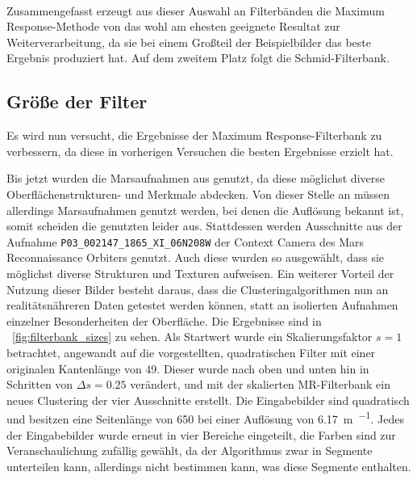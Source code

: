 \paragraph{}
Zusammengefasst erzeugt aus dieser Auswahl an Filterbänden die Maximum Response-Methode von \cite{visgeo} das wohl am ehesten geeignete Resultat zur Weiterverarbeitung, da sie bei einem Großteil der Beispielbilder das beste Ergebnis produziert hat. Auf dem zweitem Platz folgt die Schmid-Filterbank.

\subsection{Größe der Filter}
\label{ssec:exp_filtersize}


Es wird nun versucht, die Ergebnisse der Maximum Response-Filterbank zu verbessern, da diese in vorherigen Versuchen die besten Ergebnisse erzielt hat.

Bis jetzt wurden die Marsaufnahmen aus \cite[Kap.~7]{greeley_13} genutzt, da diese möglichst diverse Oberflächenstrukturen- und Merkmale abdecken. Von dieser Stelle an müssen allerdings Marsaufnahmen genutzt werden, bei denen die Auflösung bekannt ist, somit scheiden die genutzten leider aus. Stattdessen werden Ausschnitte aus der Aufnahme \texttt{P03\_002147\_1865\_XI\_06N208W} der Context Camera des Mars Reconnaissance Orbiters genutzt. Auch diese wurden so ausgewählt, dass sie möglichst diverse Strukturen und Texturen aufweisen. Ein weiterer Vorteil der Nutzung dieser Bilder besteht daraus, dass die Clusteringalgorithmen nun an realitätsnähreren Daten getestet werden können, statt an isolierten Aufnahmen einzelner Besonderheiten der Oberfläche. Die Ergebnisse sind in \figurename~\ref{fig:filterbank_sizes} zu sehen. Als Startwert wurde ein Skalierungsfaktor $s=1$ betrachtet, angewandt auf die vorgestellten, quadratischen Filter mit einer originalen Kantenlänge von \SI{49}{\pixel}.  Dieser wurde nach oben und unten hin in Schritten von $\Delta s=0.25$ verändert, und mit der skalierten MR-Filterbank ein neues Clustering der vier Ausschnitte erstellt. Die Eingabebilder sind quadratisch und besitzen eine Seitenlänge von \SI{650}{\pixel} bei einer Auflösung von \SI{6,17}{\meter\per\pixel}. Jedes der Eingabebilder wurde erneut in vier Bereiche eingeteilt, die Farben sind zur Veranschaulichung zufällig gewählt, da der Algorithmus zwar in Segmente unterteilen kann, allerdings nicht bestimmen kann, was diese Segmente enthalten.

